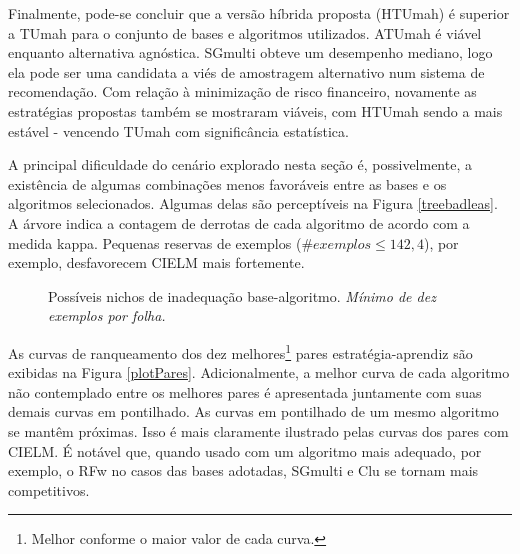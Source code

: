 Finalmente, pode-se concluir que a versão híbrida proposta (HTUmah) é superior a TUmah
para o conjunto de bases e algoritmos utilizados.
ATUmah é viável enquanto alternativa agnóstica.
SGmulti obteve um desempenho mediano,
logo ela pode ser uma candidata a viés de amostragem alternativo num sistema de recomendação.
Com relação à minimização de risco financeiro, 
novamente as estratégias propostas também se mostraram viáveis,
com HTUmah sendo a mais estável - vencendo TUmah com significância estatística.

A principal dificuldade do cenário explorado nesta seção é, possivelmente, a existência de algumas
combinações menos favoráveis entre as bases e os algoritmos selecionados.
Algumas delas são perceptíveis na Figura \ref{treebadleas}.
A árvore indica a contagem de derrotas de cada algoritmo de acordo com a medida kappa.
Pequenas reservas de exemplos ($\#exemplos \leq 142,4$),
por exemplo, desfavorecem CIELM mais fortemente.
\begin{figure}
\begin{center}
\caption{Possíveis nichos de inadequação base-algoritmo.
\textit{Mínimo de dez exemplos por folha.}}
\begin{tikzpicture} [edge from parent/.style={->,above,draw,sloped,midway,gray!30,ultra thick},
text width=2.7cm, align=flush center, grow cyclic,
level 1/.style={level distance=3.2cm,sibling angle=45},
level 2/.style={text width=2cm, font=\footnotesize, level distance=3.2cm,sibling angle=60},
level 3/.style={text width=2cm, font=\footnotesize, level distance=3.2cm,sibling angle=60},
level 4/.style={text width=2cm, font=\footnotesize, level distance=3.2cm,sibling angle=60},
level 5/.style={text width=2cm, font=\footnotesize, level distance=3.2cm,sibling angle=60},
]

\label{treebadleas}
\end{tikzpicture}
\end{center}
\end{figure}

As curvas de ranqueamento dos dez melhores\footnote{Melhor conforme o maior valor de cada curva.}
pares estratégia-aprendiz são exibidas
na Figura \ref{plotPares}. Adicionalmente, a melhor curva de cada algoritmo não contemplado
entre os melhores pares é apresentada juntamente com suas demais curvas em pontilhado.
As curvas em pontilhado de um mesmo algoritmo se mantêm próximas.
Isso é mais claramente ilustrado pelas curvas dos pares com CIELM.
É notável que, quando usado com um algoritmo mais adequado, por exemplo,
o RFw no casos das bases adotadas, SGmulti e Clu se tornam mais competitivos.

